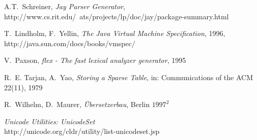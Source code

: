 \documentclass[11pt]{scrartcl}
\newcommand{\trit}{\em}
\begin{document}
\begin{thebibliography}{[00]}
  A.T.~Schreiner, {\trit Jay Parser Generator}, \\
  {http://www.cs.rit.edu/~ats/projects/lp/doc/jay/package-summary.html}
  
 T.~Lindholm, F.~Yellin, {\trit The Java Virtual Machine Specification}, 1996,\\
                   {http://java.sun.com/docs/books/vmspec/}
 
 V.~Paxson, {\trit flex - The fast lexical analyzer generator}, 1995

  R.~E. Tarjan, A.~Yao, {\trit Storing a Sparse Table}, in: Communications of the ACM 22(11), 1979 

  R.~Wilhelm, D.~Maurer, {\trit {\"U}bersetzerbau}, Berlin $1997^2$

  {\trit Unicode Utilities: UnicodeSet}\\ 
                     {http://unicode.org/cldr/utility/list-unicodeset.jsp}


\end{thebibliography}
\end{document}
